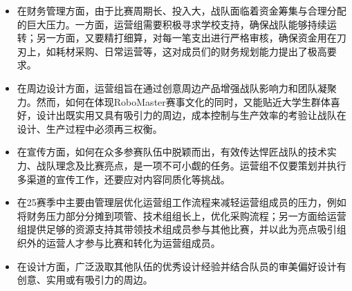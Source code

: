 
        \begin{itemize}
            \item 在财务管理方面，由于比赛周期长、投入大，战队面临着资金筹集与合理分配的巨大压力。一方面，运营组需要积极寻求学校支持，确保战队能够持续运转；另一方面，又要精打细算，对每一笔支出进行严格审核，确保资金用在刀刃上，如耗材采购、日常运营等，这对成员们的财务规划能力提出了极高要求。
            \item 在周边设计方面，运营组旨在通过创意周边产品增强战队影响力和团队凝聚力。然而，如何在体现RoboMaster赛事文化的同时，又能贴近大学生群体喜好，设计出既实用又具有吸引力的周边，成本控制与生产效率的考验让战队在设计、生产过程中必须再三权衡。
            \item 在宣传方面，如何在众多参赛队伍中脱颖而出，有效传达悍匠战队的技术实力、战队理念及比赛亮点，是一项不可小觑的任务。运营组不仅要策划并执行多渠道的宣传工作，还要应对内容同质化等挑战。
            \item 在25赛季中主要由管理层优化运营组工作流程来减轻运营组成员的压力，例如将财务压力部分分摊到项管、技术组组长上，优化采购流程；另一方面给运营组提供足够的资源支持其带领技术组成员参与其他比赛，并以此为亮点吸引组织外的运营人才参与比赛和转化为运营组成员。
            \item 在设计方面，广泛汲取其他队伍的优秀设计经验并结合队员的审美偏好设计有创意、实用或有吸引力的周边。
        \end{itemize}